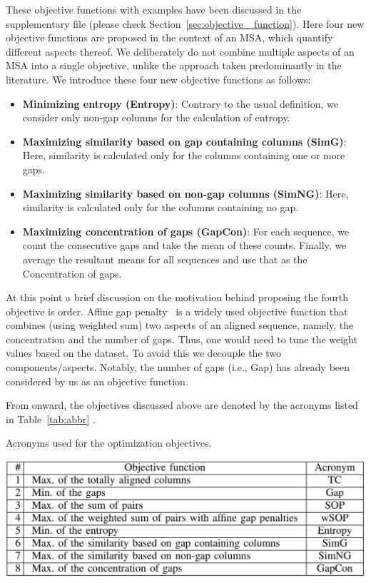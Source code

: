These objective functions with examples have been discussed in the supplementary file (please check Section~\ref{sec:objective _function}). Here  four new objective functions are proposed in the context of an MSA, which quantify different aspects thereof. We deliberately do not combine multiple aspects of an MSA into a single objective, unlike the approach taken predominantly in the literature. We introduce these four new objective functions as follows: 

\begin{itemize}
	\item \textbf{Minimizing entropy (Entropy)}: Contrary to the usual definition, we consider only non-gap columns for the calculation of entropy.
	
	\item \textbf{Maximizing similarity based on gap containing columns (SimG)}: Here, similarity is calculated only for the columns containing one or more gaps. 
	
	\item \textbf{Maximizing similarity based on non-gap columns (SimNG)}: Here, similarity is calculated only for the columns containing no gap.	
	\item \textbf{Maximizing concentration of gaps (GapCon)}: For each sequence, we count the consecutive gaps and take the mean of these counts. Finally, we average the resultant means for all sequences and use that as the Concentration of gaps.
	
\end{itemize}
At this point a brief discussion on the motivation behind proposing the fourth objective is order. Affine gap penalty~\citep{rani2016multiple} is a widely used objective function that combines (using weighted sum) two aspects of an aligned sequence, namely, the concentration and the number of gaps. Thus, one would need to tune the weight values based on the dataset. To avoid this we decouple the two components/aspects. Notably, the number of gaps (i.e., Gap) has already been considered by us as an objective function. 


From onward, the objectives discussed above are denoted by the acronyms listed in Table~\ref{tab:abbr} . 
\begin{table}[!htbp]
	\centering
\caption{Acronyms used for the optimization objectives.}
\includegraphics[width=0.8\columnwidth]{Figure/objective_acronym}
	\label{tab:abbr}
\end{table}

